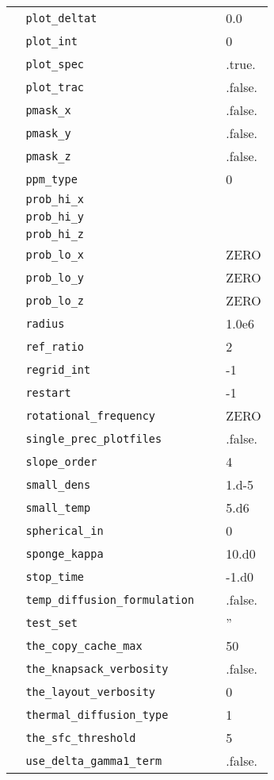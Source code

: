 {\begin{center}
\begin{longtable}{|l|p{3.25in}|l|}
\verb=  plot_deltat =  &   &  0.0 \\
\verb=  plot_int =  &   & 0 \\
\verb=  plot_spec =  &   & .true. \\
\verb=  plot_trac =  &   & .false. \\
\verb=  pmask_x =  &   &  .false. \\
\verb=  pmask_y =  &   &  .false. \\
\verb=  pmask_z =  &   &  .false. \\
\verb=  ppm_type =  &   &  0 \\
\verb=  prob_hi_x =  &   &  \\
\verb=  prob_hi_y =  &   &  \\
\verb=  prob_hi_z =  &   &  \\
\verb=  prob_lo_x =  &   &  ZERO \\
\verb=  prob_lo_y =  &   &  ZERO \\
\verb=  prob_lo_z =  &   &  ZERO \\
\verb=  radius =  &   &  1.0e6 \\
\verb=  ref_ratio =  &   &  2 \\
\verb=  regrid_int =  &   &  -1 \\
\verb=  restart =  &   & -1 \\
\verb=  rotational_frequency =  &   &  ZERO \\
\verb=  single_prec_plotfiles =  &   &  .false. \\
\verb=  slope_order =  &   &  4 \\
\verb=  small_dens =  &   &  1.d-5 \\
\verb=  small_temp =  &   &  5.d6 \\
\verb=  spherical_in =  &   &  0 \\
\verb=  sponge_kappa =  &   &  10.d0 \\
\verb=  stop_time =  &   &  -1.d0 \\
\verb=  temp_diffusion_formulation =  &   &  .false. \\
\verb=  test_set =  &   &  '' \\
\verb=  the_copy_cache_max =  &   & 50 \\
\verb=  the_knapsack_verbosity =  &   &  .false. \\
\verb=  the_layout_verbosity =  &   &  0 \\
\verb=  thermal_diffusion_type =  &   &  1 \\
\verb=  the_sfc_threshold =  &   & 5 \\
\verb=  use_delta_gamma1_term =  &   &  .false. \\

\end{longtable}
\end{center}}
